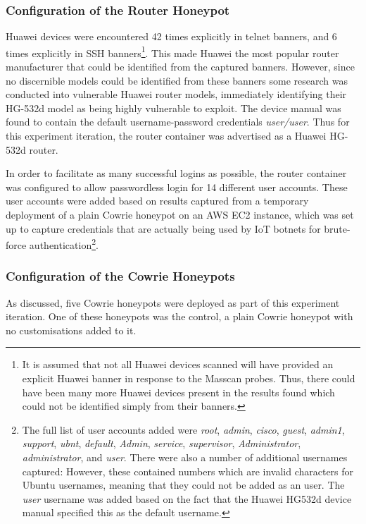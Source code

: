 \subsubsection{Configuration of the Router Honeypot}
Huawei devices were encountered 42 times explicitly in telnet banners, and 6 times explicitly in SSH banners\footnote{It is assumed that not all Huawei devices scanned will have provided an explicit Huawei banner in response to the Masscan probes. Thus, there could have been many more Huawei devices present in the results found which could not be identified simply from their banners. }. This made Huawei the most popular router manufacturer that could be identified from the captured banners. However, since no discernible models could be identified from these banners some research was conducted into vulnerable Huawei router models, immediately identifying their HG-532d model as being highly vulnerable to exploit. \cite{HuaweiHG532dVulnerabilityAdvisory} \cite{CheckpointHuaweiHG532dVulnerability} The device manual was found to contain the default username-password credentials \textit{user/user}. Thus for this experiment iteration, the router container was advertised as a Huawei HG-532d router. 

In order to facilitate as many successful logins as possible, the router container was configured to allow passwordless login for 14 different user accounts. These user accounts were added based on results captured from a temporary deployment of a plain Cowrie honeypot on an AWS EC2 instance, which was set up to capture credentials that are actually being used by IoT botnets for brute-force authentication\footnote{The full list of user accounts added were \textit{root}, \textit{admin}, \textit{cisco}, \textit{guest}, \textit{admin1}, \textit{support}, \textit{ubnt}, \textit{default}, \textit{Admin}, \textit{service}, \textit{supervisor}, \textit{Administrator}, \textit{administrator}, and \textit{user}. There were also a number of additional usernames captured: However, these contained numbers which are invalid characters for Ubuntu usernames, meaning that they could not be added as an user. The \textit{user} username was added based on the fact that the Huawei HG532d device manual specified this as the default username.}. 

\subsubsection{Configuration of the Cowrie Honeypots}
As discussed, five Cowrie honeypots were deployed as part of this experiment iteration. One of these honeypots was the control, a plain Cowrie honeypot with no customisations added to it.


